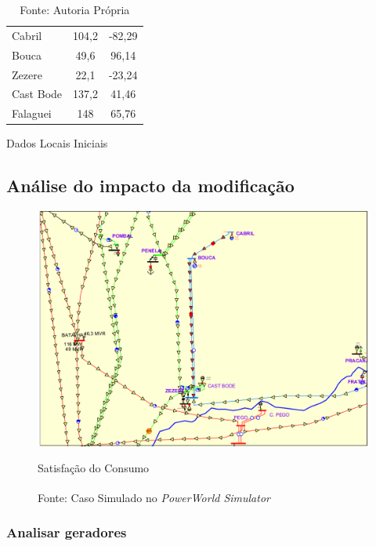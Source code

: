 \begin{table}[H]
\begin{tabular}{lcc}
Cabril                              & 104,2                                & -82,29        \\
Bouca                               & 49,6                                 & 96,14         \\
Zezere                              & 22,1                                 & -23,24        \\
Cast Bode                           & 137,2                                & 41,46         \\
Falaguei                            & 148                                  & 65,76        
\end{tabular}
\caption{Dados Locais Iniciais}
  \vspace{-3.5mm}
	\caption*{Fonte: Autoria Própria}
  \label{tab:DadosLocaisIniciais}
\end{table}

\subsection{Análise do impacto da modificação}

\begin{figure}[H]
	\centering
	\captionsetup{width=1\textwidth, font=footnotesize, textfont=bf}	
	\includegraphics[width=1\linewidth]{img/caso1After.pdf}
	\caption{Satisfação do Consumo}
	\vspace{-3.5mm}
	\caption*{Fonte: Caso Simulado no \textit{PowerWorld\textsuperscript{\textregistered} Simulator}}
	\label{fig:caso1After}
\end{figure}

\subsubsection{Analisar geradores}

